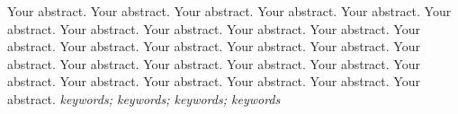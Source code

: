 Your abstract. Your abstract. Your abstract. Your abstract. Your abstract. Your abstract. Your abstract. Your abstract. Your abstract. Your abstract. Your abstract. Your abstract. Your abstract. Your abstract. Your abstract. Your abstract. Your abstract. Your abstract. Your abstract. Your abstract. Your abstract. Your abstract. Your abstract. Your abstract. Your abstract. Your abstract.
{} \textit{keywords; keywords; keywords; keywords}


































